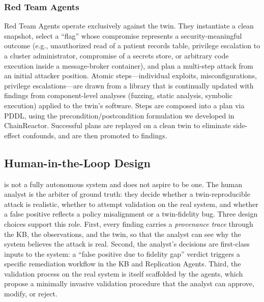 \subsubsection{Red Team Agents}
Red Team Agents operate exclusively against the twin. They instantiate
a clean snapshot, select a ``flag'' whose compromise represents a
security-meaningful outcome (e.g., unauthorized read of a patient
records table, privilege escalation to a cluster administrator,
compromise of a secrets store, or arbitrary code execution inside a
message-broker container), and plan a multi-step attack from an initial
attacker position. Atomic steps---individual exploits, misconfigurations,
privilege escalations---are drawn from a library that is continually
updated with findings from component-level analyses (fuzzing, static
analysis, symbolic execution) applied to the twin's software. Steps
are composed into a plan via PDDL, using the precondition/postcondition
formulation we developed in ChainReactor. Successful plans are
replayed on a clean twin to eliminate side-effect confounds, and are
then promoted to findings.

\subsection{Human-in-the-Loop Design}
\label{sec:approach-human}

\sysname is not a fully autonomous system and does not aspire to be
one. The human analyst is the arbiter of ground truth: they decide
whether a twin-reproducible attack is realistic, whether to attempt
validation on the real system, and whether a false positive reflects a
policy misalignment or a twin-fidelity bug. Three design choices
support this role. First, every finding carries a \emph{provenance
trace} through the KB, the observations, and the twin, so that the
analyst can see why the system believes the attack is real. Second,
the analyst's decisions are first-class inputs to the system: a
``false positive due to fidelity gap'' verdict triggers a specific
remediation workflow in the KB and Replication Agents. Third, the
validation process on the real system is itself scaffolded by the
agents, which propose a minimally invasive validation procedure that
the analyst can approve, modify, or reject.
